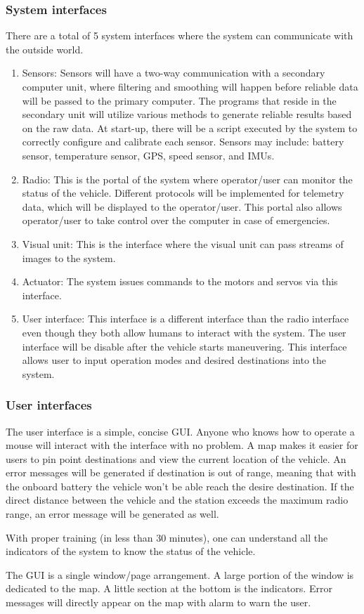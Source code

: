 \documentclass[compsoc,draftclsnofoot,onecolumn,10pt]{IEEEtran}
\begin{document}
\subsubsection{System interfaces} %
There are a total of 5 system interfaces where the system can communicate with 
the outside world.
\begin{enumerate}
	\item Sensors: Sensors will have a two-way communication with a secondary 
computer unit, where filtering and smoothing will happen before reliable data will 
be passed to the primary computer. The programs that reside in the secondary unit 
will utilize various methods to generate reliable results based on the raw data. 
At start-up, there will be a script executed by the system to correctly configure 
and calibrate each sensor. Sensors may include: battery sensor, temperature sensor, 
GPS, speed sensor, and IMUs.
	\item Radio: This is the portal of the system where operator/user can monitor 
the status of the vehicle. Different protocols will be implemented for telemetry data, 
which will be displayed to the operator/user. This portal also allows operator/user to 
take control over the computer in case of emergencies. 
	\item Visual unit: This is the interface where the visual unit can pass streams 
of images to the system.
	\item Actuator: The system issues commands to the motors and servos via this 
interface. 
	\item User interface: This interface is a different interface than the radio 
interface even though they both allow humans to interact with the system. The user 
interface will be disable after the vehicle starts maneuvering. This interface allows 
user to input operation modes and desired destinations into the system.
\end{enumerate}

\subsubsection{User interfaces} %
The user interface is a simple, concise GUI. Anyone who knows how to operate a mouse 
will interact with the interface with no problem. A map makes it easier for users to 
pin point destinations and view the current location of the vehicle. An error messages 
will be generated if destination is out of range, meaning that with the onboard battery 
the vehicle won’t be able reach the desire destination. If the direct distance between 
the vehicle and the station exceeds the maximum radio range, an error message will be 
generated as well.\par
With proper training (in less than 30 minutes), one can understand all the indicators 
of the system to know the status of the vehicle.\par
The GUI is a single window/page arrangement. A large portion of the window is dedicated 
to the map. A little section at the bottom is the indicators. Error messages will directly 
appear on the map with alarm to warn the user.\par
\end{document}
